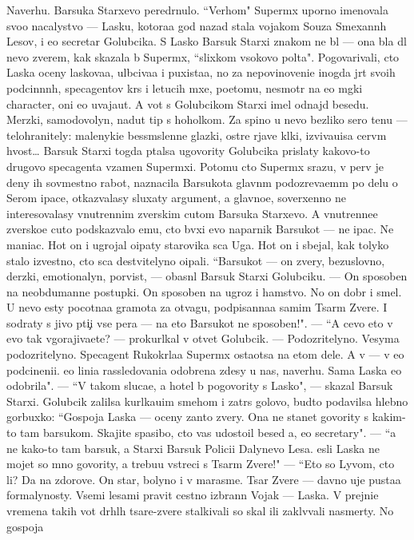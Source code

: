 \documentclass[12pt]{book}
\begin{document}
Naverhu. Barsuka Starxevo pered{\e}rnulo. ``Verhom" Superm{\yi}x uporno imenovala svo{\y}o nacalystvo — Lasku, kotora{\y}a god nazad stala vojakom So{\y}uza Smexann{\yi}h Lesov, i {\y}e{\y}o secretar{\ia} Golubcika. S Lasko{\y} Barsuk Starxi{\y} znakom ne b{\yi}l — ona b{\yi}la dl{\ia} nevo zverem, kak skazala b{\yi} Superm{\yi}x, ``slixkom v{\yi}sokovo pol{\e}ta". Pogovarivali, cto Laska oceny laskova{\y}a, ul{\yi}bciva{\y}a i puxista{\y}a, no za nepovinoveni{\y}e inogda jr{\e}t svo{\y}ih podcin{\e}nn{\yi}h, specagentov kr{\yi}s i letucih m{\yi}xe{\y}, poetomu, nesmotr{\ia} na {\y}e{\y}o m{\ia}gki{\y} character, oni {\y}e{\y}o uvaja{\y}ut. A vot s Golubcikom Starxi{\y} imel odnajd{\yi} besedu. Merzki{\y}, samodovolyn{\yi}{\y}, nadut{\yi}{\y} tip s hoholkom. Za spino{\y} u nevo bezliko{\y} sero{\y} ten{\y}u — telohranitely: malenyki{\y}e bessm{\yi}slenn{\yi}{\y}e glazki, ostr{\yi}{\y}e rjav{\yi}{\y}e kl{\yi}ki, izviva{\y}u{\x}i{\y}sa cerv{\e}m hvost… Barsuk Starxi{\y} togda p{\yi}talsa ugovority Golubcika prislaty kakovo-to drugovo specagenta vzamen Superm{\yi}xi. Potomu cto Superm{\yi}x srazu, v perv{\yi}{\y} je deny ih sovmestno{\y} rabot{\yi}, naznacila Barsukota glavn{\yi}m podozreva{\y}em{\yi}m po delu o Serom {\X}ipace, otkaz{\yi}valasy sluxaty argument{\yi}, a glavno{\y}e, soverxenno ne interesovalasy vnutrennim zverskim cut{\y}om Barsuka Starxevo. A vnutrenne{\y}e zversko{\y}e cut{\y}o podskaz{\yi}valo {\y}emu, cto b{\yi}vxi{\y} {\y}evo naparnik Barsukot — ne {\X}ipac. Ne maniac. Hot{\ia} on i ugrojal o{\x}ipaty star{\y}ov{\x}ika s{\yi}ca Uga. Hot{\ia} on i sbejal, kak tolyko stalo izvestno, cto s{\yi}ca de{\y}stvitelyno o{\x}ipali. ``Barsukot — on zvery, bezuslovno, derzki{\y}, emotionalyn{\yi}{\y}, por{\yi}vist{\yi}{\y}, — ob{\y}asn{\ia}l Barsuk Starxi{\y} Golubciku. — On sposoben na neobdumann{\yi}{\y}e postupki. On sposoben na ugroz{\yi} i hamstvo. No on dobr{\yi}{\y} i smel{\yi}{\y}. U nevo {\y}esty pocotna{\y}a gramota za otvagu, podpisanna{\y}a samim Tsar{\e}m Zvere{\y}. I sodraty s jivo{\y} pti{\c}i vse per{\y}a — na eto Barsukot ne sposoben!". — ``A cevo eto v{\yi} {\y}evo tak v{\yi}gorajiva{\y}ete? — prokurl{\yi}kal v otvet Golubcik. — Podozritelyno. Vesyma podozritelyno. Specagent Rukokr{\yi}la{\y}a Superm{\yi}x osta{\y}otsa na etom dele. A v{\yi} — v {\y}e{\y}o podcineni{\y}i. {\Y}e{\y}o lini{\y}a rassledovani{\y}a odobrena zdesy u nas, naverhu. Sama Laska {\y}e{\y}o odobrila". — ``V takom sluca{\y}e, {\y}a hotel b{\yi} pogovority s Lasko{\y}", — skazal Barsuk Starxi{\y}. Golubcik zalilsa kurl{\yi}ka{\y}u{\x}im smehom i zatr{\ia}s golovo{\y}, budto podavilsa hlebno{\y} gorbuxko{\y}: ``Gospoja Laska — oceny zan{\ia}to{\y} zvery. Ona ne stanet govority s kakim-to tam barsukom. Skajite spasibo, cto vas udostoil besed{\yi} {\y}a, {\y}e{\y}o secretary". — ``{\Y}a ne kako{\y}-to tam barsuk, a Starxi{\y} Barsuk Polici{\y}i Dalynevo Lesa. {\Y}esli Laska ne mojet so mno{\y} govority, {\y}a trebu{\y}u vstreci s Tsar{\e}m Zvere{\y}!" — ``Eto so Lyvom, cto li? Da na zdorov{\y}e. On star{\yi}{\y}, bolyno{\y} i v marasme. Tsar Zvere{\y} — davno uje pusta{\y}a formalynosty. Vsemi lesami pravit cestno izbrann{\yi}{\y} Vojak — Laska. V prejni{\y}e vremena takih vot dr{\ia}hl{\yi}h tsare{\y}-zvere{\y} stalkivali so skal{\yi} ili zakl{\e}v{\yi}vali nasmerty. No gospoja 
\end{document}
